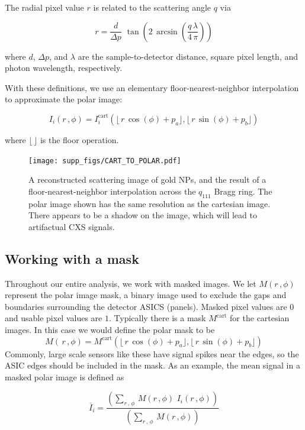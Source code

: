 \documentclass [12pt,fleqn]{article}
\def \be {\begin{equation}}
\def \ee {\end{equation}}
\begin{document}
The radial pixel value $r$ is related to the scattering angle $q$ via

\be
r = \frac{d}{\Delta p}\,\,\tan\left(2\,\arcsin \left( \frac{q\,\lambda}{4\,\pi}  \right) \right)
\ee

where $d$, $\Delta p$, and $\lambda$ are the sample-to-detector distance, square pixel length, and photon wavelength, respectively.

With these definitions, we use an elementary floor-nearest-neighbor interpolation to approximate the polar image:

\begin{equation} \label{polimg}
I_i(r \,, \phi) = I_i ^{ \mathrm{cart} }\left ( \lfloor\,  r \,\cos(\phi)+p_a \rfloor, \lfloor\, r\, \sin(\phi) +p_b \rfloor \right)
\end{equation}

where $\lfloor\,\rfloor$ is the floor operation.

\begin{figure}[H]
\texttt{[image: supp\_figs/CART\_TO\_POLAR.pdf]}
\caption{A reconstructed scattering image of gold NPs, and the result of a floor-nearest-neighbor interpolation across the $q_{111}$ Bragg ring. The polar image shown has the same resolution as the cartesian image. There appears to be a shadow on the image, which will lead to artifactual CXS signals.}
\label{supp:cart2pol}
\end{figure}

\subsection{Working with a mask}
Throughout our entire analysis, we work with masked images. We let $M(r\,,\phi)$ represent the polar image mask, a binary image used to exclude the gaps and boundaries surrounding the detector ASICS (panels). Masked pixel values are $0$ and usable pixel values are $1$. Typically there is a mask $M^{\text{cart}}$ for the cartesian images. In this case we would define the polar mask to be $$M(\,r\,, \phi) = M^{\text{cart}} \left ( \lfloor\, r\,\cos(\phi)+p_a \rfloor, \lfloor\,r\, \sin(\phi) +p_b \rfloor \right)$$
Commonly, large scale sensors like these have signal spikes near the edges, so the ASIC edges should be included in the mask. As an example, the mean signal in a masked polar image is defined as

\begin{equation} \label{average_signal}
\overline I_i =  \frac
{\left(\sum\limits_{r\,,\,\phi}\, M( r\,,\phi )\,\,I_i(r\,,\phi) \right) }
 {\left (\sum\limits_{r\,,\,\phi}\, M ( r\,,\phi )\right )}
\end{equation}
\end{document}
